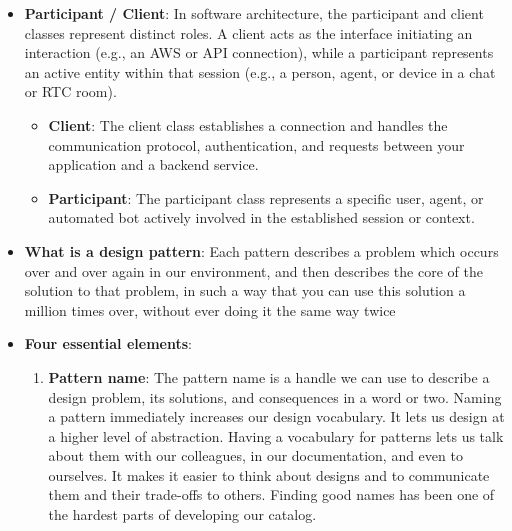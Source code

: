 \documentclass{report}
\begin{document}
\begin{itemize}
            \bigbreak \noindent 
            The pattern is typically built by wrapping a private field with an accessor method or property getter.
            \begin{enumerate}
                \item The field is initially set to null or a placeholder.
                \item When the getter is called, it checks if the instance already exists.
                \item If it exists, it returns it instantly.
                \item If it is null, it initializes the object, saves it to the field, and returns it just-in-time.
            \end{enumerate}
            \textbf{Note}: Eager initialization is when the initialization happens at the time of request.
        \item \textbf{Participant / Client}: In software architecture, the participant and client classes represent distinct roles. A client acts as the interface initiating an interaction (e.g., an AWS or API connection), while a participant represents an active entity within that session (e.g., a person, agent, or device in a chat or RTC room).
            \bigbreak \noindent 
            \begin{itemize}
                \item \textbf{Client}: The client class establishes a connection and handles the communication protocol, authentication, and requests between your application and a backend service.
                \item \textbf{Participant}: The participant class represents a specific user, agent, or automated bot actively involved in the established session or context.
            \end{itemize}
        \item \textbf{What is a design pattern}: Each pattern describes a problem which occurs over and over again in our environment, and then describes the core of the solution to that problem, in such a way that you can use this solution a million times over, without ever doing it the same way twice 
        \item \textbf{Four essential elements}:
            \begin{enumerate}
                \item \textbf{Pattern name}: The pattern name is a handle we can use to describe a design problem, its solutions, and consequences in a word or two. Naming a pattern immediately increases our design vocabulary. It lets us design at a higher level of abstraction. Having a vocabulary for patterns lets us talk about them with our colleagues, in our documentation, and even to ourselves. It makes it easier to think about designs and to communicate them and their trade-offs to others. Finding good names has been one of the hardest parts of developing our catalog.

\end{enumerate}
\end{itemize}
\end{document}
